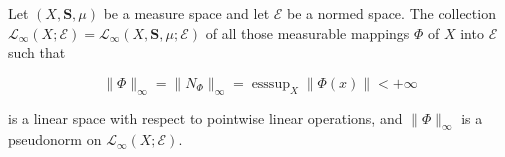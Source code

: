 Let $(X, \mathbf{S}, \mu)$ be a measure space and let $\mathcal{E}$ be a normed space. The collection $\mathcal{L}_{\infty}(X; \mathcal{E}) = \mathcal{L}_{\infty}(X, \mathbf{S}, \mu; \mathcal{E})$ of all those measurable mappings $\Phi$ of $X$ into $\mathcal{E}$ such that

$$\|\Phi\|_{\infty} = \|N_{\Phi}\|_{\infty} = \operatorname{ess sup}_{X} \|\Phi(x)\| < +\infty$$

is a linear space with respect to pointwise linear operations, and $\|\Phi\|_{\infty}$ is a pseudonorm on $\mathcal{L}_{\infty}(X; \mathcal{E})$.

